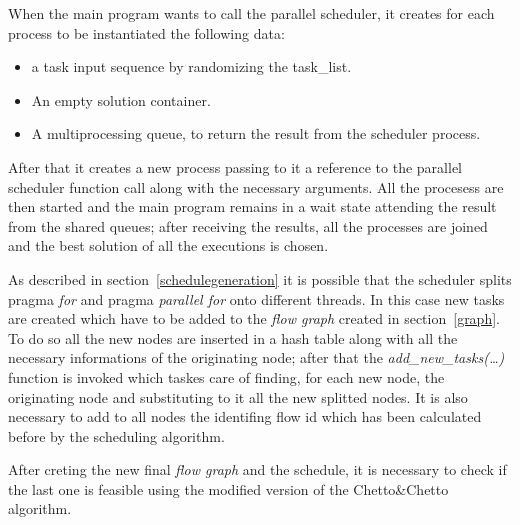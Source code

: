 \documentclass[a4paper,12pt,oneside]{book}
\begin{document}
When the main program wants to call the parallel scheduler, it creates for each process to be instantiated the following data:
\begin{itemize}
\item {a task input sequence by randomizing the task\_list.}
\item{An empty solution container.}
\item{A multiprocessing queue, to return the result from the scheduler process.}
\end{itemize}

After that it creates a new process passing to it a reference to the parallel scheduler function call along with the necessary arguments. All the procesess are then started and the main program remains in a wait state attending the result from the shared queues; after receiving the results, all the processes are joined and the best solution of all the executions is chosen.

As described in section~\ref{schedulegeneration} it is possible that the scheduler splits pragma \emph{for} and pragma \emph{parallel for} onto different threads. In this case new tasks are created which have to be added to the \emph{flow graph} created in section~\ref{graph}. To do so all the new nodes are inserted in a hash table along with all the necessary informations of the originating node; after that the \emph{add\_new\_tasks(\dots)} function is invoked which taskes care of finding, for each new node, the originating node and substituting to it all the new splitted nodes. It is also necessary to add to all nodes the identifing flow id which has been calculated before by the scheduling algorithm.

After creting the new final \emph{flow graph} and the schedule, it is necessary to check if the last one is feasible using the modified version of the Chetto\&Chetto algorithm.
\end{document}
